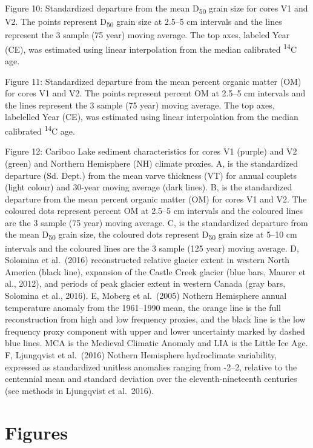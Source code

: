 \documentclass[
  letterpaper,
  DIV=11,
  numbers=noendperiod]{scrartcl}
\begin{document}
Figure 10: Standardized departure from the mean D\textsubscript{50}
grain size for cores V1 and V2. The points represent D\textsubscript{50}
grain size at 2.5--5 cm intervals and the lines represent the 3 sample
(75 year) moving average. The top axes, labeled Year (CE), was estimated
using linear interpolation from the median calibrated
\textsuperscript{14}C age.

Figure 11: Standardized departure from the mean percent organic matter
(OM) for cores V1 and V2. The points represent percent OM at 2.5--5 cm
intervals and the lines represent the 3 sample (75 year) moving average.
The top axes, labelelled Year (CE), was estimated using linear
interpolation from the median calibrated \textsuperscript{14}C age.

Figure 12: Cariboo Lake sediment characteristics for cores V1 (purple)
and V2 (green) and Northern Hemisphere (NH) climate proxies. A, is the
standardized departure (Sd. Dept.) from the mean varve thickness (VT)
for annual couplets (light colour) and 30-year moving average (dark
lines). B, is the standardized departure from the mean percent organic
matter (OM) for cores V1 and V2. The coloured dots represent percent OM
at 2.5--5 cm intervals and the coloured lines are the 3 sample (75 year)
moving average. C, is the standardized departure from the mean
D\textsubscript{50} grain size, the coloured dots represent
D\textsubscript{50} grain size at 5--10 cm intervals and the coloured
lines are the 3 sample (125 year) moving average. D, Solomina et
al.~(2016) reconstructed relative glacier extent in western North
America (black line), expansion of the Castle Creek glacier (blue bars,
Maurer et al., 2012), and periods of peak glacier extent in western
Canada (gray bars, Solomina et al., 2016). E, Moberg et al.~(2005)
Nothern Hemisphere annual temperature anomaly from the 1961--1990 mean,
the orange line is the full reconstruction from high and low frequency
proxies, and the black line is the low frequency proxy component with
upper and lower uncertainty marked by dashed blue lines. MCA is the
Medieval Climatic Anomaly and LIA is the Little Ice Age. F, Ljungqvist
et al.~(2016) Nothern Hemisphere hydroclimate variability, expressed as
standardized unitless anomalies ranging from -2--2, relative to the
centennial mean and standard deviation over the eleventh-nineteenth
centuries (see methods in Ljungqvist et al.~2016).\pagebreak

\hypertarget{figures}{%
\section{Figures}\label{figures}}
\end{document}
